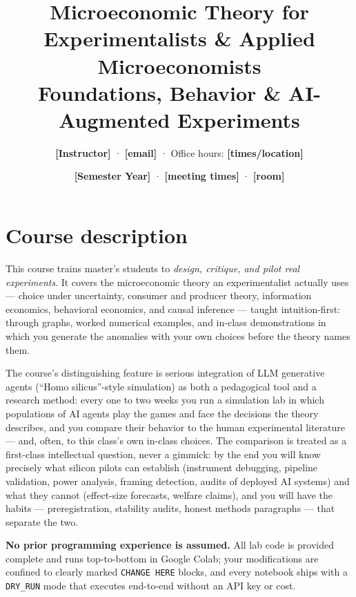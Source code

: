 \documentclass[11pt]{article}
\title{Microeconomic Theory for Experimentalists \& Applied
Microeconomists\\
\large Foundations, Behavior \& AI-Augmented Experiments}
\author{\textbf{[Instructor]} \quad · \quad \textbf{[email]} \quad ·
\quad Office hours: \textbf{[times/location]}}
\date{\textbf{[Semester Year]} · \textbf{[meeting times]} ·
\textbf{[room]}}
\begin{document}
\maketitle

\section*{Course description}
This course trains master's students to \emph{design, critique, and
pilot real experiments}. It covers the microeconomic theory an
experimentalist actually uses --- choice under uncertainty, consumer
and producer theory, information economics, behavioral economics, and
causal inference --- taught intuition-first: through graphs, worked
numerical examples, and in-class demonstrations in which you generate
the anomalies with your own choices before the theory names them.

The course's distinguishing feature is serious integration of LLM
generative agents (``Homo silicus''-style simulation) as both a
pedagogical tool and a research method: every one to two weeks you run
a simulation lab in which populations of AI agents play the games and
face the decisions the theory describes, and you compare their behavior
to the human experimental literature --- and, often, to this class's
own in-class choices. The comparison is treated as a first-class
intellectual question, never a gimmick: by the end you will know
precisely what silicon pilots can establish (instrument debugging,
pipeline validation, power analysis, framing detection, audits of
deployed AI systems) and what they cannot (effect-size forecasts,
welfare claims), and you will have the habits --- preregistration,
stability audits, honest methods paragraphs --- that separate the two.

\textbf{No prior programming experience is assumed.} All lab code is
provided complete and runs top-to-bottom in Google Colab; your
modifications are confined to clearly marked \texttt{CHANGE HERE}
blocks, and every notebook ships with a \texttt{DRY\_RUN} mode that
executes end-to-end without an API key or cost.
\end{document}

